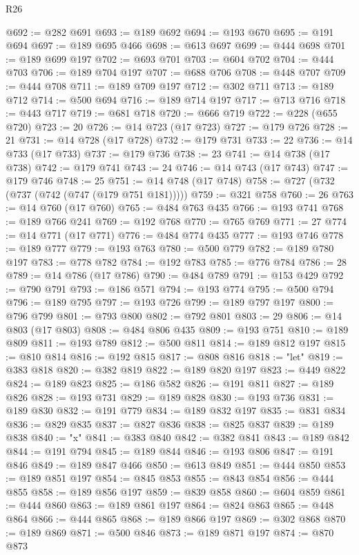\begin{lexlean}{R26}
\begin{coremodule}
@692 := @282 @691
@693 := @189 @692
@694 := @193 @670
@695 := @191 @694
@697 := @189 @695 @466
@698 := @613 @697
@699 := @444 @698
@701 := @189 @699 @197
@702 := @693 @701
@703 := @604 @702
@704 := @444 @703
@706 := @189 @704 @197
@707 := @688 @706
@708 := @448 @707
@709 := @444 @708
@711 := @189 @709 @197
@712 := @302 @711
@713 := @189 @712
@714 := @500 @694
@716 := @189 @714 @197
@717 := @713 @716
@718 := @443 @717
@719 := @681 @718
@720 := @666 @719
@722 := @228 (@655 @720)
@723 := 20
@726 := @14 @723 (@17 @723)
@727 := @179 @726
@728 := 21
@731 := @14 @728 (@17 @728)
@732 := @179 @731
@733 := 22
@736 := @14 @733 (@17 @733)
@737 := @179 @736
@738 := 23
@741 := @14 @738 (@17 @738)
@742 := @179 @741
@743 := 24
@746 := @14 @743 (@17 @743)
@747 := @179 @746
@748 := 25
@751 := @14 @748 (@17 @748)
@758 := @727 (@732 (@737 (@742 (@747 (@179 @751 @181)))))
@759 := @321 @758
@760 := 26
@763 := @14 @760 (@17 @760)
@765 := @484 @763 @435
@766 := @193 @741
@768 := @189 @766 @241
@769 := @192 @768
@770 := @765 @769
@771 := 27
@774 := @14 @771 (@17 @771)
@776 := @484 @774 @435
@777 := @193 @746
@778 := @189 @777
@779 := @193 @763
@780 := @500 @779
@782 := @189 @780 @197
@783 := @778 @782
@784 := @192 @783
@785 := @776 @784
@786 := 28
@789 := @14 @786 (@17 @786)
@790 := @484 @789
@791 := @153 @429
@792 := @790 @791
@793 := @186 @571
@794 := @193 @774
@795 := @500 @794
@796 := @189 @795
@797 := @193 @726
@799 := @189 @797 @197
@800 := @796 @799
@801 := @793 @800
@802 := @792 @801
@803 := 29
@806 := @14 @803 (@17 @803)
@808 := @484 @806 @435
@809 := @193 @751
@810 := @189 @809
@811 := @193 @789
@812 := @500 @811
@814 := @189 @812 @197
@815 := @810 @814
@816 := @192 @815
@817 := @808 @816
@818 := "let"
@819 := @383 @818
@820 := @382 @819
@822 := @189 @820 @197
@823 := @449 @822
@824 := @189 @823
@825 := @186 @582
@826 := @191 @811
@827 := @189 @826
@828 := @193 @731
@829 := @189 @828
@830 := @193 @736
@831 := @189 @830
@832 := @191 @779
@834 := @189 @832 @197
@835 := @831 @834
@836 := @829 @835
@837 := @827 @836
@838 := @825 @837
@839 := @189 @838
@840 := "x"
@841 := @383 @840
@842 := @382 @841
@843 := @189 @842
@844 := @191 @794
@845 := @189 @844
@846 := @193 @806
@847 := @191 @846
@849 := @189 @847 @466
@850 := @613 @849
@851 := @444 @850
@853 := @189 @851 @197
@854 := @845 @853
@855 := @843 @854
@856 := @444 @855
@858 := @189 @856 @197
@859 := @839 @858
@860 := @604 @859
@861 := @444 @860
@863 := @189 @861 @197
@864 := @824 @863
@865 := @448 @864
@866 := @444 @865
@868 := @189 @866 @197
@869 := @302 @868
@870 := @189 @869
@871 := @500 @846
@873 := @189 @871 @197
@874 := @870 @873

\end{coremodule}
\end{lexlean}
